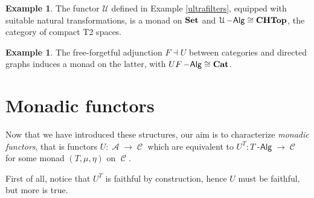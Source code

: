 \documentclass[a4paper,11pt,oneside,openany]{scrbook}
\newcommand{\catname}[1]{{\normalfont\textbf{#1}}}
\DeclareMathOperator{\Alg}{-\mathsf{Alg}}
\newcommand{\Set}{\catname{Set}}
\newcommand{\CHTop}{\catname{CHTop}}
\newcommand{\Cat}{\catname{Cat}}
\DeclareMathOperator{\A}{\mathcal{A}}
\DeclareMathOperator{\C}{\mathcal{C}}
\theoremstyle{definition}
\theoremstyle{definition}
\newtheorem{exmp}[thm]{Example}
\begin{document}
	\begin{exmp}
		The functor $\mathcal{U}$ defined in Example \ref{ultrafilters}, equipped with suitable natural transformations, is a monad on $\Set$ and $\mathcal{U}\Alg\cong \CHTop$, the category of compact T2 spaces.
	\end{exmp}

	\begin{exmp}
		The free-forgetful adjunction $F\dashv U$ between categories and directed graphs induces a monad on the latter, with $UF\Alg\cong\Cat$.
	\end{exmp}

	\section{Monadic functors}
	
	Now that we have introduced these structures, our aim is to characterize \emph{monadic functors}, that is functors $U\colon\A\rightarrow\C$ which are equivalent to $U^T\colon T\Alg\rightarrow\C$ for some monad $(T,\mu,\eta)$ on $\C$.

	First of all, notice that $U^T$ is faithful by construction, hence $U$ must be faithful, but more is true.
	
\end{document}
